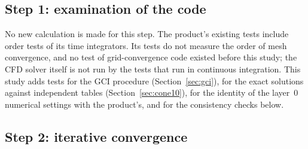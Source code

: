 \documentclass[11pt,a4paper]{article}
\begin{document}
\subsection{Step 1: examination of the code}
\label{sec:step1}

No new calculation is made for this step.
The product's existing tests include order tests of its time integrators.
Its tests do not measure the order of mesh convergence, and no test of grid-convergence code existed before this
study; the CFD solver itself is not run by the tests that run in continuous integration.
This study adds tests for the GCI procedure (Section~\ref{sec:gci}), for the exact solutions against independent
tables (Section~\ref{sec:cone10}), for the identity of the layer~0 numerical settings with the product's, and for
the consistency checks below.

\subsection{Step 2: iterative convergence}
\label{sec:iter}
\end{document}
